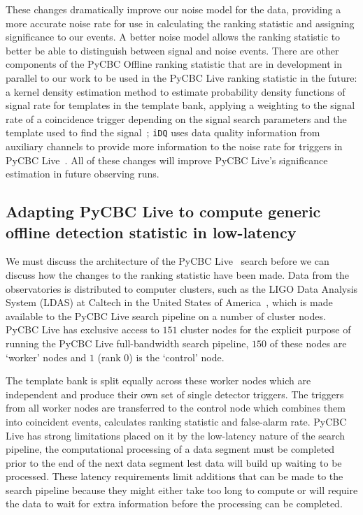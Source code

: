 These changes dramatically improve our noise model for the data, providing a more accurate noise rate for use in calculating the ranking statistic and assigning significance to our \gwadj events. A better noise model allows the ranking statistic to better be able to distinguish between signal and noise events. There are other components of the PyCBC Offline ranking statistic that are in development in parallel to our work to be used in the PyCBC Live ranking statistic in the future: a kernel density estimation method to estimate probability density functions of signal rate for templates in the template bank, applying a weighting to the signal rate of a coincidence trigger depending on the signal search parameters and the template used to find the signal~\cite{PyCBC_focussed_bbh:2024}; \texttt{iDQ} uses data quality information from auxiliary channels to provide more information to the noise rate for triggers in PyCBC Live~\cite{iDQ:2020}. All of these changes will improve PyCBC Live's significance estimation in future observing runs. 

\subsection{\label{5:sec:methodology}Adapting PyCBC Live to compute generic offline detection statistic in low-latency}

We must discuss the architecture of the PyCBC Live~\cite{PyCBC_Live:2018} search before we can discuss how the changes to the ranking statistic have been made. Data from the \gwadj observatories is distributed to computer clusters, such as the LIGO Data Analysis System (LDAS) at Caltech in the United States of America~\cite{ldas_caltech:2024}, which is made available to the PyCBC Live search pipeline on a number of cluster nodes. PyCBC Live has exclusive access to $151$ cluster nodes for the explicit purpose of running the PyCBC Live full-bandwidth search pipeline, $150$ of these nodes are `worker' nodes and $1$ (rank 0) is the `control' node.

The template bank is split equally across these worker nodes which are independent and produce their own set of single detector triggers. The triggers from all worker nodes are transferred to the control node which combines them into coincident events, calculates ranking statistic and false-alarm rate. PyCBC Live has strong limitations placed on it by the low-latency nature of the search pipeline, the computational processing of a data segment must be completed prior to the end of the next data segment lest data will build up waiting to be processed. These latency requirements limit additions that can be made to the search pipeline because they might either take too long to compute or will require the data to wait for extra information before the processing can be completed.

